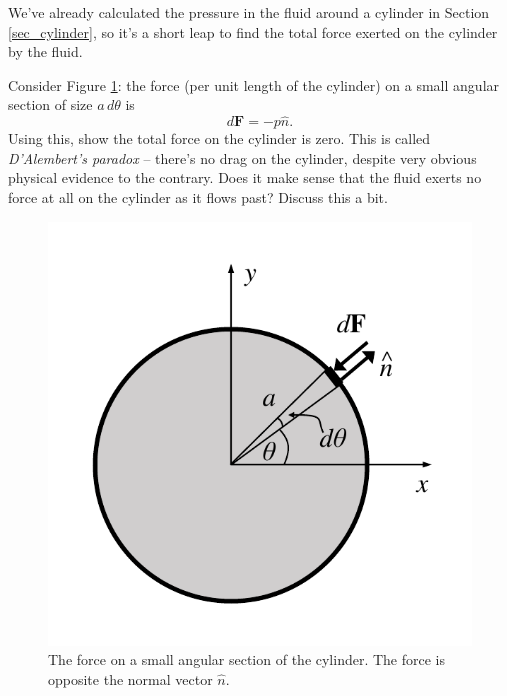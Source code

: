\begin{problem}
We've already calculated the pressure in the fluid around a cylinder in Section \ref{sec_cylinder}, so it's a short leap to find the total force exerted on the cylinder by the fluid.

Consider Figure \ref{fig_cylinder_force}:  the force (per unit length of the cylinder) on a small angular section of size $a \, d\theta$ is
\[
d\textbf{F} = - p \hat{n}.
\]
Using this, show the total force on the cylinder is zero.  This is called \emph{D'Alembert's paradox} -- there's no drag on the cylinder, despite very obvious physical evidence to the contrary.  Does it make sense that the fluid exerts no force at all on the cylinder as it flows past?  Discuss this a bit.

\begin{figure}[t]
\centering\includegraphics[width=0.5\linewidth]{Figures/Chapter3/fig_cyl_force}
\caption{The force on a small angular section of the cylinder.  The force is opposite the normal vector $\hat{n}$.}
\label{fig_cylinder_force}
\end{figure}

\end{problem}
